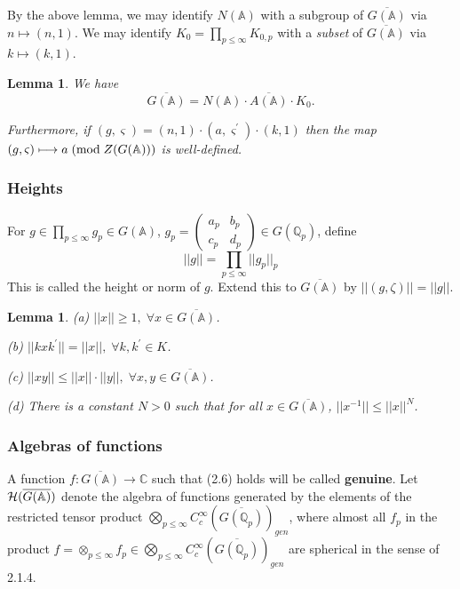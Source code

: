 \documentclass[amsfonts,12pt]{article}
\newtheorem{lemma}[theorem]{Lemma}
\def\aaa{\mathbb{A}}
\def\qqq{\mathbb{Q}}
\def\ccc{\mathbb{C}}
\begin{document}
By the above lemma, we may identify $N(\aaa )$ with a subgroup of $%
\overline{G(\aaa )}$ via $n\longmapsto (n,1)$. We may identify $%
K_0=\prod_{p\leq \infty }K_{0,p}$ with a {\em subset} of
$\overline{G(\aaa )}$ via $k\longmapsto (k,1)$.

\begin{lemma}
We have 
\[
\overline{G(\aaa )}
=N(\aaa )\cdot \overline{A(\aaa )}\cdot K_0.
\]

Furthermore, if $(g,\varsigma )=(n,1)\cdot (a,\varsigma ^{\prime })\cdot
(k,1)$ then the map
$(g,\varsigma )\longmapsto a\;({\rm mod}\;Z(G(\aaa )))$
is well-defined.
\end{lemma}

\subsubsection{Heights}

For $g\in \prod_{p\leq \infty }g_p\in G(\aaa )$,
$g_p=\left( 
\begin{array}{cc}
a_p & b_p \\ 
c_p & d_p
\end{array}
\right) \in G(\qqq_p)$, define 
\begin{equation}
||g||=\prod_{p\leq \infty }||g_p||_p
\end{equation}
This is called the height or norm of $g$. Extend this to
$\overline{G(\aaa )}$ by $||(g,\zeta)||=||g||$.

\begin{lemma}
(a) $||x||\geq 1,\;\forall x\in \overline{G(\aaa )}$.

(b) $||kxk^{\prime }||=||x||,\;\forall k,k^{\prime }\in K$.

(c) $||xy||\leq ||x||\cdot ||y||,\;\forall x,y\in \overline{G(\aaa )}$.

(d) There is a constant $N>0$ such that for all
$x\in \overline{G(\aaa )}$,
$||x^{-1}||\leq ||x||^N$.
\end{lemma}

\subsubsection{Algebras of functions}

A function $f:\overline{G(\aaa )}\rightarrow \ccc $
such that (2.6)
holds will be called {\bf genuine}. Let 
${\cal{H}}(\overline{G(\aaa )})$ denote the algebra of 
functions generated by the elements of the
restricted tensor product 
$\bigotimes_{p\leq \infty }
C_c^\infty (\overline{G(\qqq_p)})_{gen}$, 
where almost all $f_p$ in the product 
$f=\otimes _{p\leq \infty}f_p\in 
\bigotimes_{p\leq \infty }C_c^\infty (\overline{G(\qqq_p)})_{gen}$ are
spherical in the sense of 2.1.4.
\end{document}
